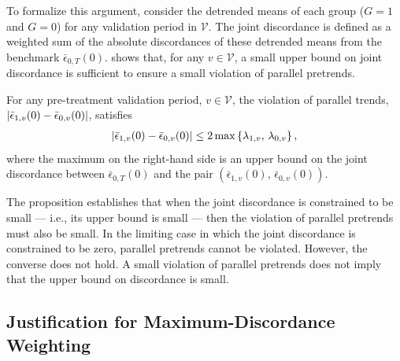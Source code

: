 \documentclass[twoside,11pt]{article}
\begin{document}
To formalize this argument, consider the detrended means of each group ($G = 1$ and $G = 0$) for any validation period in $\mathcal{V}$. The joint discordance is defined as a weighted sum of the absolute discordances of these detrended means from the benchmark $\bar{\epsilon}_{0,T}(0)$.  shows that, for any $v \in \mathcal{V}$, a small upper bound on joint discordance is sufficient to ensure a small violation of parallel pretrends.
\begin{proposition} \label{prop: concordance parallel trends}
For any pre-treatment validation period, $v \in \mathcal{V}$, the violation of parallel trends, $\lvert\bar{\epsilon}_{1,v}(0) - \bar{\epsilon}_{0,v}(0)\rvert$, satisfies
\begin{align} \label{eq: pretrends bound}
\lvert\bar{\epsilon}_{1,v}(0) - \bar{\epsilon}_{0,v}(0)\rvert \leq 2 \max\left\{\lambda_{1,v}, \, \lambda_{0,v} \right\},
\end{align}
where the maximum on the right-hand side is an upper bound on the joint discordance between $\bar{\epsilon}_{0,T}(0)$ and the pair $(\bar{\epsilon}_{1,v}(0), \, \bar{\epsilon}_{0,v}(0))$.
\end{proposition}
\noindent The proposition establishes that when the joint discordance is constrained to be small --- i.e., its upper bound is small --- then the violation of parallel pretrends must also be small. In the limiting case in which the joint discordance is constrained to be zero, parallel pretrends cannot be violated. However, the converse does not hold. A small violation of parallel pretrends does not imply that the upper bound on discordance is small.


\subsection{Justification for Maximum-Discordance Weighting} \label{ssec: weighting}
\end{document}
